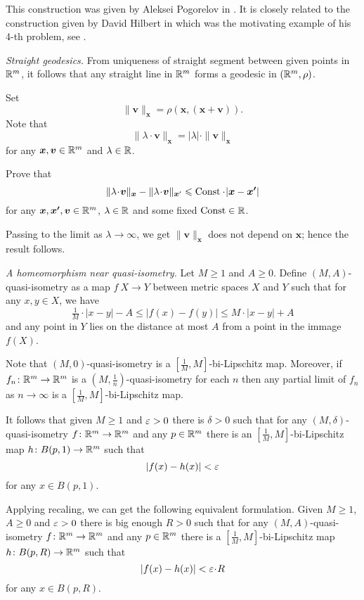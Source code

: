 This construction was given by 
Aleksei Pogorelov in \cite{pogorelov}.
It is closely related to the construction given 
by David Hilbert in \cite{hilbert}
which was the motivating example of his 4-th problem,
see \cite{hilbert-problems}.


\textit{Straight geodesics.}
From uniqueness of straight segment between given points in $\mathbb{R}^m$,
it follows that any straight line in $\mathbb{R}^m$ forms a geodesic in $(\mathbb{R}^m,\rho)$.

Set 
\[\|\bm{v}\|_{\bm{x}}=\rho(\bm{x},(\bm{x}+\bm{v})).\]
Note that 
\[ \|\lambda\cdot\bm{v}\|_{\bm{x}}
=
|\lambda|\cdot\|\bm{v}\|_{\bm{x}}\]
for any $\bm{x},\bm{v}\in\mathbb{R}^m$ and $\lambda\in\mathbb{R}$.

Prove that 
\[
\|\lambda\cdot\bm{v}\|_{\bm{x}}
-
\|\lambda\cdot\bm{v}\|_{\bm{x}'}
\le 
\Const\cdot |\bm{x}-\bm{x'}|\]
for any $\bm{x},\bm{x'},\bm{v}\in\mathbb{R}^m$, 
$\lambda\in\mathbb{R}$
and some fixed $\operatorname{\rm Const}\in\mathbb{R}$.

Passing to the limit as $\lambda\to\infty$, 
we get
$\|\bm{v}\|_{\bm{x}}$ does not depend on $\bm{x}$;
hence the result follows.



\textit{A homeomorphism near quasi-isometry.}
Let $M\ge 1$ and $A\ge 0$.
Define $(M,A)$-quasi-isometry
as a map $f\:X\to Y$ between metric spaces $X$ and $Y$ such that for any $x,y\in X$,
 we have
\[\tfrac1M\cdot |x-y|-A\le |f(x)-f(y)|\le M\cdot |x-y|+A\]
and any point in $Y$ lies on the distance at most $A$ from a point in the immage $f(X)$.

Note that $(M,0)$-quasi-isometry is a $[\tfrac1M,M]$-bi-Lipschitz map.
Moreover,
if $f_n\colon\mathbb{R}^m\to\mathbb{R}^m$ is a  $(M,\frac1n)$-quasi-isometry 
for each $n$ then any partial limit of $f_n$ as $n\to\infty$
is a $[\tfrac1M,M]$-bi-Lipschitz map.

It follows that given $M\ge 1$ and $\varepsilon>0$ there is $\delta>0$ such that 
for any $(M,\delta)$-quasi-isometry $f\colon\mathbb{R}^m\to\mathbb{R}^m$ and any $p\in \mathbb{R}^m$
there is an $[\tfrac1M,M]$-bi-Lipschitz map $h\colon B(p,1)\to \mathbb{R}^m$
such that
\[|f(x)-h(x)|<\varepsilon\]
for any $x\in B(p,1)$.

Applying recaling, we can get the following equivalent formulation. 
Given $M\ge 1$, $A\ge 0$ and $\varepsilon>0$
there is big enough $R>0$ such that for any $(M,A)$-quasi-isometry 
$f\colon\mathbb{R}^m\to\mathbb{R}^m$ and any $p\in\mathbb{R}^m$ there is a $[\tfrac1M,M]$-bi-Lipschitz map $h\colon B(p,R)\to \mathbb{R}^m$
such that 
\[|f(x)-h(x)|<\eps\cdot R\]
for any $x\in B(p,R)$.

